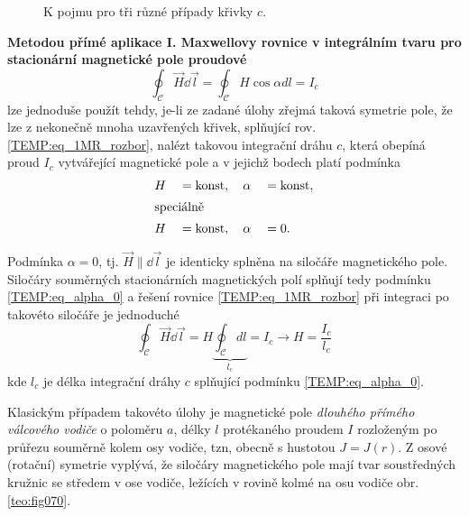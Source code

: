     \begin{figure}[ht!]
      \centering
        {}
        {}
        {}             
      \caption{K pojmu  pro tři různé případy křivky $c$.}
      \label{teo:fig069}
    \end{figure}
    
    \textbf{Metodou přímé aplikace I. Maxwellovy rovnice v integrálním tvaru pro stacionární
    magnetické pole proudové}
    \begin{equation}\label{TEMP:eq_1MR_rozbor}
      \oint_{\mathcal{C}}\vec{H}\dd{\vec{l}} = \oint_{\mathcal{C}}H\cos\alpha dl = I_c
    \end{equation}    
    lze jednoduše použít tehdy, je-li ze zadané úlohy zřejmá taková symetrie pole, že lze z 
    nekonečně mnoha uzavřených křivek, splňující rov. \ref{TEMP:eq_1MR_rozbor}, nalézt takovou 
    integrační dráhu $c$, která obepíná proud $I_c$ vytvářející magnetické pole a v jejichž bodech 
    platí podmínka
    \begin{alignat}{3}
      & H &&= \text{konst}, \quad \alpha &&= \text{konst},  \label{TEMP:eq_H_alpha_konst}  \\
      \shortintertext{speciálně}  
      & H &&= \text{konst}, \quad \alpha &&= 0.             \label{TEMP:eq_alpha_0}
    \end{alignat}
    
    Podmínka \(\alpha = 0\), tj. $\vec{H}\| \dd{\vec{l}}$ je identicky splněna na siločáře magnetického 
    pole. Siločáry souměrných stacionárních magnetických polí splňují tedy podmínku 
    \ref{TEMP:eq_alpha_0} a řešení rovnice \ref{TEMP:eq_1MR_rozbor} při integraci po takovéto 
    siločáře je jednoduché
    \begin{equation}\label{TEMP:eq_1MR_alpha0}
      \oint_{\mathcal{C}}\vec{H}\dd{\vec{l}} = H\underbrace{\oint_{\mathcal{C}} dl}_{l_c} = 
                                        I_c \rightarrow H = \frac{I_c}{l_c}
    \end{equation}
    kde $l_c$ je délka integrační dráhy $c$ splňující podmínku \ref{TEMP:eq_alpha_0}.
      
    Klasickým případem takovéto úlohy je magnetické pole \emph{dlouhého přímého válcového vodiče} o
    poloměru $a$, délky $l$ protékaného proudem $I$ rozloženým po průřezu souměrně kolem osy vodiče,
    tzn, obecně s hustotou $J = J(r)$. Z osové (rotační) symetrie vyplývá, že siločáry magnetického
    pole mají tvar soustředných kružnic se středem v ose vodiče, ležících v rovině kolmé na osu
    vodiče obr. \ref{teo:fig070}.

